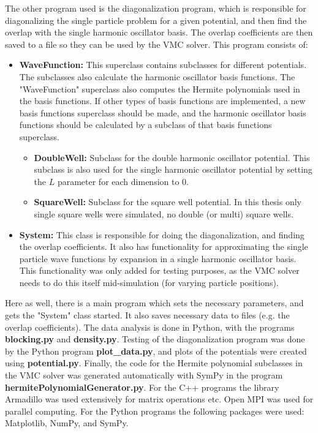 \documentclass[../main.tex]{subfiles}
\begin{document}
\begin{appendices}
The other program used is the diagonalization program, which is responsible for diagonalizing the single particle problem for a given potential, and then find the overlap with the single harmonic oscillator basis. The overlap coefficients are then saved to a file so they can be used by the VMC solver. This program consists of:
\begin{itemize}
    \item \textbf{WaveFunction:} This superclass contains subclasses for different potentials. The subclasses also calculate the harmonic oscillator basis functions. The "WaveFunction" superclass also computes the Hermite polynomials used in the basis functions. If other types of basis functions are implemented, a new basis functions superclass should be made, and the harmonic oscillator basis functions should be calculated by a subclass of that basis functions superclass. 
    \begin{itemize}
        \item \textbf{DoubleWell:} Subclass for the double harmonic oscillator potential. This subclass is also used for the single harmonic oscillator potential by setting the $L$ parameter for each dimension to $0$.
        \item \textbf{SquareWell:} Subclass for the square well potential. In this thesis only single square wells were simulated, no double (or multi) square wells.
    \end{itemize}
    \item \textbf{System:} This class is responsible for doing the diagonalization, and finding the overlap coefficients. It also has functionality for approximating the single particle wave functions by expansion in a single harmonic oscillator basis. This functionality was only added for testing purposes, as the VMC solver needs to do this itself mid-simulation (for varying particle positions).
\end{itemize}

Here as well, there is a main program which sets the necessary parameters, and gets the "System" class started. It also saves necessary data to files (e.g. the overlap coefficients). The data analysis is done in Python, with the programs {\bf blocking.py} and {\bf density.py}. Testing of the diagonalization program was done by the Python program \textbf{plot\_data.py}, and plots of the potentials were created using \textbf{potential.py}. Finally, the code for the Hermite polynomial subclasses in the VMC solver was generated automatically with SymPy in the program \textbf{hermitePolynomialGenerator.py}. For the C++ programs the library Armadillo\cite{Armadillo} was used extensively for matrix operations etc. Open MPI\cite{Open MPI} was used for parallel computing. For the Python programs the following packages were used: Matplotlib\cite{Matplotlib}, NumPy\cite{NumPy}, and SymPy\cite{SymPy}.




\end{appendices}
\end{document}

